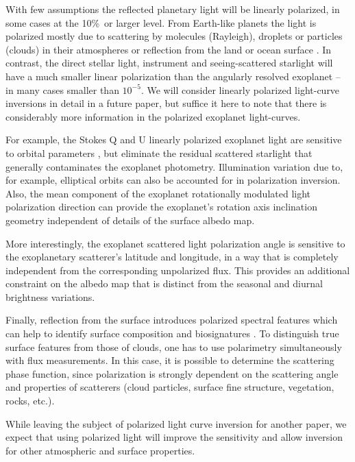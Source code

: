 \documentclass{emulateapj}
\begin{document}
With few assumptions the reflected planetary light will be linearly polarized, 
in some cases at the 10\%\ or larger level.  
From Earth-like planets the light is polarized mostly due to
scattering by molecules (Rayleigh), droplets or particles (clouds) 
in their atmospheres or reflection from the land or ocean surface \citep{earthpol}.
In contrast, the direct stellar light,
instrument and seeing-scattered starlight will have a much smaller linear polarization 
than the angularly resolved exoplanet -- in many cases smaller than $10^{-5}$. 
We will consider linearly polarized light-curve inversions in detail in a future paper, 
but suffice it here to note that there
is considerably more information in the polarized exoplanet light-curves. 

For example, the Stokes Q and U linearly polarized exoplanet light are
sensitive to orbital parameters \citep{fluri&berd2010}, but eliminate 
the residual scattered starlight that generally contaminates the exoplanet photometry. 
Illumination variation due to, for example, elliptical orbits can also be accounted for 
in polarization inversion.  
Also, the mean component of the exoplanet rotationally modulated light polarization 
direction can provide the exoplanet's rotation axis inclination geometry independent 
of details of the surface albedo map.

More interestingly, the exoplanet scattered light polarization angle is sensitive 
to the exoplanetary scatterer's latitude and longitude,
in a way that is completely independent from the corresponding unpolarized flux. 
This provides an additional  constraint on the albedo map that is distinct
from the seasonal and diurnal brightness variations.
 
Finally, reflection from the surface introduces polarized spectral features 
which can help to identify
surface composition \citep{polder} and biosignatures \citep{berdetal2016}. 
To distinguish true surface features from those of clouds, one has to use
polarimetry simultaneously with flux measurements.
In this case, it is possible to determine the scattering phase function,
since polarization is strongly dependent on the scattering angle
and properties of scatterers 
(cloud particles, surface fine structure, vegetation, rocks, etc.).

While leaving the subject
of polarized light curve inversion for another paper, we expect that using
polarized light will improve the sensitivity and allow inversion for
other atmospheric and surface properties.
\end{document}
